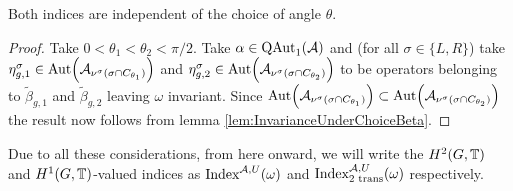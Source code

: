 \documentclass[11pt,a4paper,twoside]{article}
\numberwithin{equation}{section}
\begin{document}
	\begin{lemma}
		Both indices are independent of the choice of angle $\theta$.
	\end{lemma}
	\begin{proof}
		Take $0<\theta_1<\theta_2<\pi/2$. Take $\alpha\in \QAut{\AA}$ and (for all $\sigma\in\{L,R\}$) take $\eta_{g,1}^\sigma\in\Aut{\AA_{\nu^{\sigma}(\sigma\cap C_{\theta_1})}}$ and $\eta_{g,2}^\sigma\in\Aut{\AA_{\nu^{\sigma}(\sigma\cap C_{\theta_2})}}$ to be operators belonging to $\tilde{\beta}_{g,1}$ and $\tilde{\beta}_{g,2}$ leaving $\omega$ invariant. Since $\Aut{\AA_{\nu^{\sigma}(\sigma\cap C_{\theta_1})}}\subset \Aut{\AA_{\nu^{\sigma}(\sigma\cap C_{\theta_2})}}$ the result now follows from lemma \ref{lem:InvarianceUnderChoiceBeta}.
	\end{proof}
	Due to all these considerations, from here onward, we will write the $H^2(G,\TT)$ and $H^1(G,\TT)$-valued indices as $\textrm{Index}^{\AA,U}(\omega)$ and $\textrm{Index}^{\AA,U}_{\text{2 trans}}(\omega)$ respectively.
\end{document}
